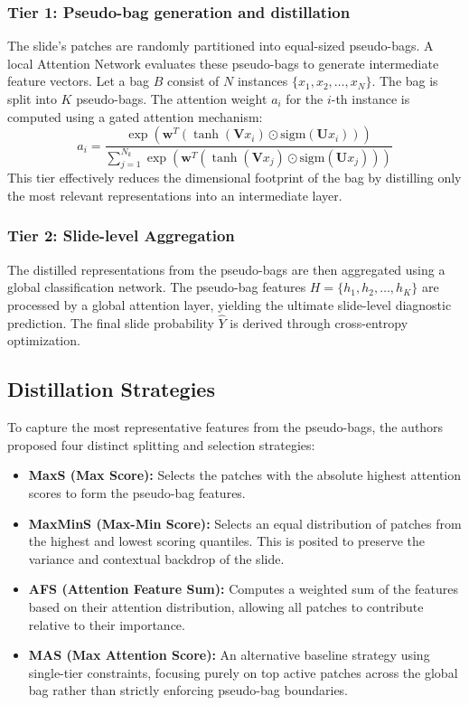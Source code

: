\documentclass[11pt,a4paper]{article}
\begin{document}
\subsubsection{Tier 1: Pseudo-bag generation and distillation}
The slide's patches are randomly partitioned into equal-sized pseudo-bags. A local Attention Network evaluates these pseudo-bags to generate intermediate feature vectors. Let a bag $B$ consist of $N$ instances $\{x_1, x_2, \dots, x_N\}$. The bag is split into $K$ pseudo-bags. The attention weight $a_i$ for the $i$-th instance is computed using a gated attention mechanism:
\begin{equation}
a_i = \frac{\exp\left( \mathbf{w}^T (\tanh(\mathbf{V}x_i) \odot \text{sigm}(\mathbf{U}x_i)) \right)}{\sum_{j=1}^{N_k} \exp\left( \mathbf{w}^T (\tanh(\mathbf{V}x_j) \odot \text{sigm}(\mathbf{U}x_j)) \right)}
\end{equation}
This tier effectively reduces the dimensional footprint of the bag by distilling only the most relevant representations into an intermediate layer.

\subsubsection{Tier 2: Slide-level Aggregation}
The distilled representations from the pseudo-bags are then aggregated using a global classification network. The pseudo-bag features $H = \{h_1, h_2, \dots, h_K\}$ are processed by a global attention layer, yielding the ultimate slide-level diagnostic prediction. The final slide probability $\hat{Y}$ is derived through cross-entropy optimization.

\subsection{Distillation Strategies}
To capture the most representative features from the pseudo-bags, the authors proposed four distinct splitting and selection strategies:
\begin{itemize}
    \item \textbf{MaxS (Max Score):} Selects the patches with the absolute highest attention scores to form the pseudo-bag features.
    \item \textbf{MaxMinS (Max-Min Score):} Selects an equal distribution of patches from the highest and lowest scoring quantiles. This is posited to preserve the variance and contextual backdrop of the slide.
    \item \textbf{AFS (Attention Feature Sum):} Computes a weighted sum of the features based on their attention distribution, allowing all patches to contribute relative to their importance.
    \item \textbf{MAS (Max Attention Score):} An alternative baseline strategy using single-tier constraints, focusing purely on top active patches across the global bag rather than strictly enforcing pseudo-bag boundaries.
\end{itemize}
\end{document}
